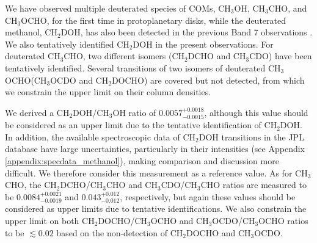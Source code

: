 \documentclass[linenumbers, twocolumn, twocolappendix, astrosymb, times]{aastex631}
\newcommand{\methanol}{CH$_3$OH\xspace}
\newcommand{\acetaldehyde}{CH$_3$CHO\xspace}
\newcommand{\methylformate}{CH$_3$OCHO\xspace}
\begin{document}
We have observed multiple deuterated species of COMs, \methanol, \acetaldehyde, and \methylformate, for the first time in protoplanetary disks, while the deuterated methanol, CH$_2$DOH, has also been detected in the previous Band 7 observations \citep{Lee2019}. We also tentatively identified CH$_2$DOH in the present observations. For deuterated \acetaldehyde, two different isomers (CH$_2$DCHO and CH$_3$CDO) have been tentatively identified. Several transitions of two isomers of deuterated \methylformate (CH$_3$OCDO and CH$_2$DOCHO) are covered but not detected, from which we constrain the upper limit on their column densities. 

\textrm{We derived a CH$_2$DOH/CH$_3$OH ratio of $0.0057_{-0.0015}^{+0.0018}$, although this value should be considered as an upper limit due to the tentative identification of CH$_2$DOH. In addition, the available spectroscopic data of CH$_2$DOH transitions in the JPL database have large uncertainties, particularly in their intensities (see Appendix \ref{appendix:specdata_methanol}), making comparison and discussion more difficult. We therefore consider this measurement as a reference value. As for \acetaldehyde, the CH$_2$DCHO/\acetaldehyde and CH$_3$CDO/\acetaldehyde ratios are measured to be $0.0084_{-0.0019}^{+0.0021}$ and $0.043_{-0.012}^{+0.012}$, respectively, but again these values should be considered as upper limits due to tentative identifications. We also constrain the upper limit on both CH$_2$DOCHO/\methylformate and CH$_3$OCDO/\methylformate ratios to be $\lesssim0.02$ based on the non-detection of CH$_2$DOCHO and CH$_3$OCDO.}
\end{document}
